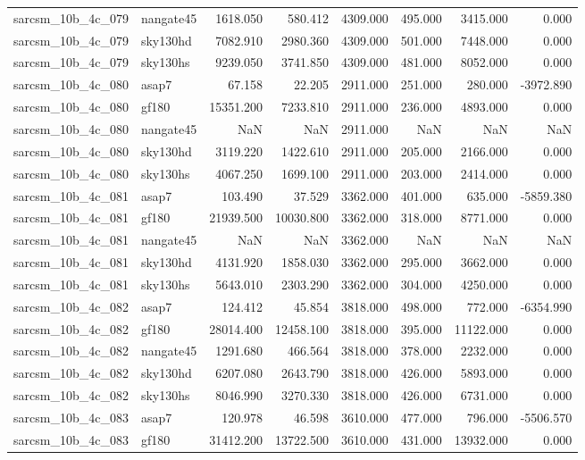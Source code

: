 \begin{tabular}{llrrrrrr}
sarcsm\_10b\_4c\_079 & nangate45 & 1618.050 & 580.412 & 4309.000 & 495.000 & 3415.000 & 0.000 \\
sarcsm\_10b\_4c\_079 & sky130hd & 7082.910 & 2980.360 & 4309.000 & 501.000 & 7448.000 & 0.000 \\
sarcsm\_10b\_4c\_079 & sky130hs & 9239.050 & 3741.850 & 4309.000 & 481.000 & 8052.000 & 0.000 \\
sarcsm\_10b\_4c\_080 & asap7 & 67.158 & 22.205 & 2911.000 & 251.000 & 280.000 & -3972.890 \\
sarcsm\_10b\_4c\_080 & gf180 & 15351.200 & 7233.810 & 2911.000 & 236.000 & 4893.000 & 0.000 \\
sarcsm\_10b\_4c\_080 & nangate45 & NaN & NaN & 2911.000 & NaN & NaN & NaN \\
sarcsm\_10b\_4c\_080 & sky130hd & 3119.220 & 1422.610 & 2911.000 & 205.000 & 2166.000 & 0.000 \\
sarcsm\_10b\_4c\_080 & sky130hs & 4067.250 & 1699.100 & 2911.000 & 203.000 & 2414.000 & 0.000 \\
sarcsm\_10b\_4c\_081 & asap7 & 103.490 & 37.529 & 3362.000 & 401.000 & 635.000 & -5859.380 \\
sarcsm\_10b\_4c\_081 & gf180 & 21939.500 & 10030.800 & 3362.000 & 318.000 & 8771.000 & 0.000 \\
sarcsm\_10b\_4c\_081 & nangate45 & NaN & NaN & 3362.000 & NaN & NaN & NaN \\
sarcsm\_10b\_4c\_081 & sky130hd & 4131.920 & 1858.030 & 3362.000 & 295.000 & 3662.000 & 0.000 \\
sarcsm\_10b\_4c\_081 & sky130hs & 5643.010 & 2303.290 & 3362.000 & 304.000 & 4250.000 & 0.000 \\
sarcsm\_10b\_4c\_082 & asap7 & 124.412 & 45.854 & 3818.000 & 498.000 & 772.000 & -6354.990 \\
sarcsm\_10b\_4c\_082 & gf180 & 28014.400 & 12458.100 & 3818.000 & 395.000 & 11122.000 & 0.000 \\
sarcsm\_10b\_4c\_082 & nangate45 & 1291.680 & 466.564 & 3818.000 & 378.000 & 2232.000 & 0.000 \\
sarcsm\_10b\_4c\_082 & sky130hd & 6207.080 & 2643.790 & 3818.000 & 426.000 & 5893.000 & 0.000 \\
sarcsm\_10b\_4c\_082 & sky130hs & 8046.990 & 3270.330 & 3818.000 & 426.000 & 6731.000 & 0.000 \\
sarcsm\_10b\_4c\_083 & asap7 & 120.978 & 46.598 & 3610.000 & 477.000 & 796.000 & -5506.570 \\
sarcsm\_10b\_4c\_083 & gf180 & 31412.200 & 13722.500 & 3610.000 & 431.000 & 13932.000 & 0.000 \\

\end{tabular}
